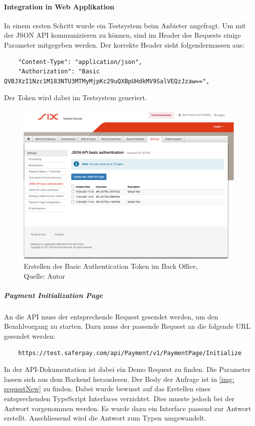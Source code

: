  \paragraph{Integration in Web Applikation}
 In einem ersten Schritt wurde ein Testsystem beim Anbieter angefragt.
 Um mit der JSON API kommunizieren zu können, sind im Header des Requests einige Parameter mitgegeben werden. Der korrekte Header sieht folgendermassen aus: 
 \begin{verbatim}
	"Content-Type": "application/json", 
	"Authorization": "Basic QVBJXzI1Nzc1M183NTU3MTMyMjpKc29uQXBpUHdkMV9SalVEQzJzaw==",
 \end{verbatim}
Der Token wird dabei im Testsystem generiert. 
\begin{figure}[H]
	\centering
	\includegraphics[width=1\textwidth]{images/basicAuth.PNG}
	\caption[Erstellen des Basic Authentication Token im Back Office]{Erstellen des Basic Authentication Token im Back Office,\\ Quelle: Autor}
	\label{img: basicAuth}
\end{figure} 
 \subparagraph{Payment Initialization Page}
 An die API muss der entsprechende Request gesendet werden, um den Bezahlvorgang zu starten. Dazu muss der passende Request an die folgende URL gesendet werden: 
 \begin{verbatim}
 	https://test.saferpay.com/api/Payment/v1/PaymentPage/Initialize
 \end{verbatim}
In der API-Dokumentation ist dabei ein Demo Request zu finden. Die Parameter lassen sich aus dem Backend herauslesen. 
Der Body der Anfrage ist in \ref{img: requestNew} zu finden. 
Dabei wurde bewusst auf das Erstellen eines entsprechenden TypeScript Interfaces verzichtet. 
Dies musste jedoch bei der Antwort vorgenommen werden. 
Es wurde dazu ein Interface passend zur Antwort erstellt. Anschliessend wird die Antwort zum Typen umgewandelt. 

